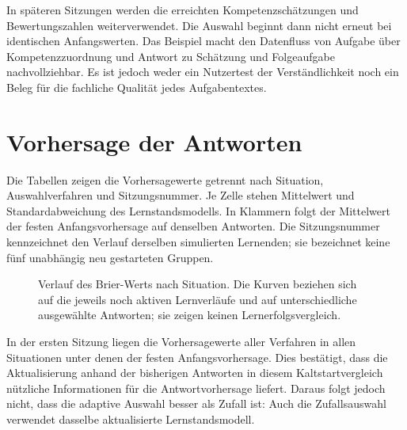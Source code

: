 In späteren Sitzungen werden die erreichten Kompetenzschätzungen und
Bewertungszahlen weiterverwendet. Die Auswahl beginnt dann nicht erneut
bei identischen Anfangswerten. Das Beispiel macht den Datenfluss von
Aufgabe über Kompetenzzuordnung und Antwort zu Schätzung und Folgeaufgabe
nachvollziehbar. Es ist jedoch weder ein Nutzertest der Verständlichkeit
noch ein Beleg für die fachliche Qualität jedes Aufgabentextes.

\section{Vorhersage der Antworten}
\label{sec:evaluation-lernstand}

Die Tabellen zeigen die Vorhersagewerte getrennt nach Situation,
Auswahlverfahren und Sitzungsnummer. Je Zelle stehen Mittelwert und
Standardabweichung des Lernstandsmodells. In Klammern folgt der Mittelwert
der festen Anfangsvorhersage auf denselben Antworten. Die Sitzungsnummer
kennzeichnet den Verlauf derselben simulierten Lernenden; sie bezeichnet
keine fünf unabhängig neu gestarteten Gruppen.

\begin{table}[htbp]
  \centering
  \resizebox{\textwidth}{!}{\EvaluationBrierTable}
  \caption{Brier-Wert der Antwortvorhersagen über bis zu fünf Sitzungen.
    In Klammern: feste Vorhersage von $44{,}5\%$. Ein Index $n$ weist auf
    eine von 100 abweichende Fallzahl hin.}
  \label{tab:brier}
\end{table}

\begin{table}[htbp]
  \centering
  \resizebox{\textwidth}{!}{\EvaluationLogLossTable}
  \caption{Log-Loss der Antwortvorhersagen. Darstellung und Referenz
    entsprechen Tabelle~\ref{tab:brier}.}
  \label{tab:logloss}
\end{table}

\begin{figure}[htbp]
  \centering
  \EvaluationBrierPlot
  \caption{Verlauf des Brier-Werts nach Situation. Die Kurven beziehen
    sich auf die jeweils noch aktiven Lernverläufe und auf unterschiedliche
    ausgewählte Antworten; sie zeigen keinen Lernerfolgsvergleich.}
  \label{fig:brier}
\end{figure}

In der ersten Sitzung liegen die Vorhersagewerte aller Verfahren in
allen Situationen unter denen der festen Anfangsvorhersage. Dies
bestätigt, dass die Aktualisierung anhand der bisherigen Antworten in
diesem Kaltstartvergleich nützliche Informationen für die Antwortvorhersage
liefert. Daraus folgt jedoch nicht, dass die adaptive Auswahl besser als
Zufall ist: Auch die Zufallsauswahl verwendet dasselbe aktualisierte
Lernstandsmodell.

